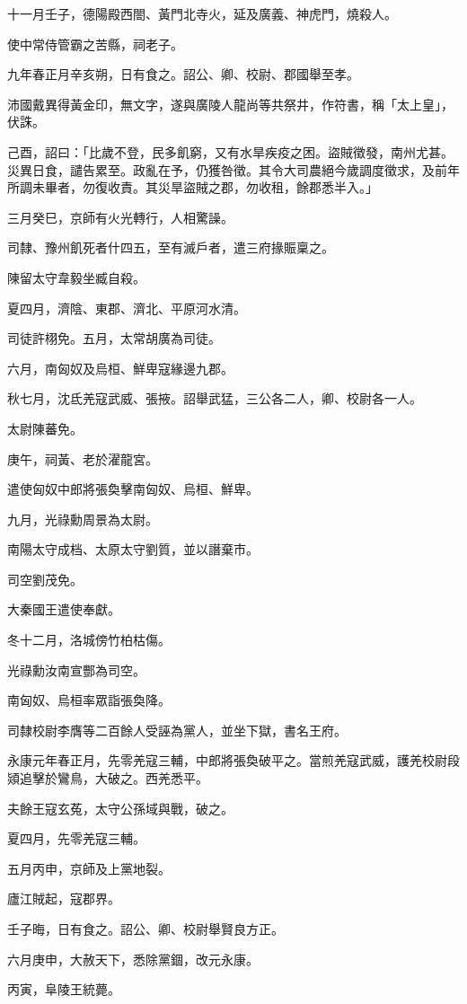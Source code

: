 \begin{pinyinscope}
十一月壬子，德陽殿西閤、黃門北寺火，延及廣義、神虎門，燒殺人。

使中常侍管霸之苦縣，祠老子。

九年春正月辛亥朔，日有食之。詔公、卿、校尉、郡國舉至孝。

沛國戴異得黃金印，無文字，遂與廣陵人龍尚等共祭井，作符書，稱「太上皇」，伏誅。

己酉，詔曰：「比歲不登，民多飢窮，又有水旱疾疫之困。盜賊徵發，南州尤甚。災異日食，譴告累至。政亂在予，仍獲咎徵。其令大司農絕今歲調度徵求，及前年所調未畢者，勿復收責。其災旱盜賊之郡，勿收租，餘郡悉半入。」

三月癸巳，京師有火光轉行，人相驚譟。

司隸、豫州飢死者什四五，至有滅戶者，遣三府掾賑稟之。

陳留太守韋毅坐臧自殺。

夏四月，濟陰、東郡、濟北、平原河水清。

司徒許栩免。五月，太常胡廣為司徒。

六月，南匈奴及烏桓、鮮卑寇緣邊九郡。

秋七月，沈氐羌寇武威、張掖。詔舉武猛，三公各二人，卿、校尉各一人。

太尉陳蕃免。

庚午，祠黃、老於濯龍宮。

遣使匈奴中郎將張奐擊南匈奴、烏桓、鮮卑。

九月，光祿勳周景為太尉。

南陽太守成档、太原太守劉質，並以譖棄市。

司空劉茂免。

大秦國王遣使奉獻。

冬十二月，洛城傍竹柏枯傷。

光祿勳汝南宣酆為司空。

南匈奴、烏桓率眾詣張奐降。

司隸校尉李膺等二百餘人受誣為黨人，並坐下獄，書名王府。

永康元年春正月，先零羌寇三輔，中郎將張奐破平之。當煎羌寇武威，護羌校尉段熲追擊於鸞鳥，大破之。西羌悉平。

夫餘王寇玄菟，太守公孫域與戰，破之。

夏四月，先零羌寇三輔。

五月丙申，京師及上黨地裂。

廬江賊起，寇郡界。

壬子晦，日有食之。詔公、卿、校尉舉賢良方正。

六月庚申，大赦天下，悉除黨錮，改元永康。

丙寅，阜陵王統薨。


\end{pinyinscope}
